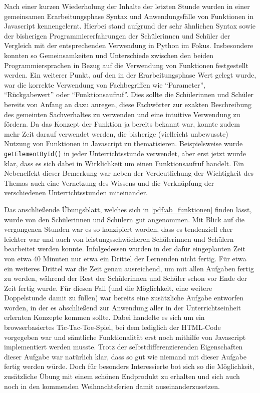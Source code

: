 Nach einer kurzen Wiederholung der Inhalte der letzten Stunde wurden in einer gemeinsamen Erarbeitungsphase Syntax und Anwendungsfälle von Funktionen in Javascript kennengelernt.
Hierbei stand aufgrund der sehr ähnlichen Syntax sowie der bisherigen Programmiererfahrungen der Schülerinnen und Schüler der Vergleich mit der entsprechenden Verwendung in Python im Fokus.
Insbesondere konnten so Gemeinsamkeiten und Unterschiede zwischen den beiden Programmiersprachen in Bezug auf die Verwendung von Funktionen festgestellt werden.
Ein weiterer Punkt, auf den in der Erarbeitungsphase Wert gelegt wurde, war die korrekte Verwendung von Fachbegriffen wie ``Parameter'', ``Rückgabewert'' oder ``Funktionsaufruf''.
Dies sollte die Schülerinnen und Schüler bereits von Anfang an dazu anregen, diese Fachwörter zur exakten Beschreibung des gemeinten Sachverhaltes zu verwenden und eine intuitive Verwendung zu fördern.
Da das Konzept der Funktion ja bereits bekannt war, konnte zudem mehr Zeit darauf verwendet werden, die bisherige (vielleicht unbewusste) Nutzung von Funktionen in Javascript zu thematisieren.
Beispielsweise wurde \texttt{getElementById()} in jeder Unterrichtsstunde verwendet, aber erst jetzt wurde klar, dass es sich dabei in Wirklichkeit um einen Funktionsaufruf handelt.
Ein Nebeneffekt dieser Bemerkung war neben der Verdeutlichung der Wichtigkeit des Themas auch eine Vernetzung des Wissens und die Verknüpfung der verschiedenen Unterrichtsstunden miteinander.

Das anschließende Übungsblatt, welches sich in \autoref{pdf:ab_funktionen} finden lässt, wurde von den Schülerinnen und Schülern gut angenommen.
Mit Blick auf die vergangenen Stunden war es so konzipiert worden, dass es tendenziell eher leichter war und auch von leistungsschwächeren Schülerinnen und Schülern bearbeitet werden konnte.
Infolgedessen wurden in der dafür eingeplanten Zeit von etwa 40 Minuten nur etwa ein Drittel der Lernenden nicht fertig.
Für etwa ein weiteres Drittel war die Zeit genau ausreichend, um mit allen Aufgaben fertig zu werden, während der Rest der Schülerinnen und Schüler schon vor Ende der Zeit fertig wurde.
Für diesen Fall (und die Möglichkeit, eine weitere Doppelstunde damit zu füllen) war bereits eine zusätzliche Aufgabe entworfen worden, in der es abschließend zur Anwendung aller in der Unterrichtseinheit erlernten Konzepte kommen sollte.
Dabei handelte es sich um ein browserbasiertes Tic-Tac-Toe-Spiel, bei dem lediglich der HTML-Code vorgegeben war und sämtliche Funktionalität erst noch mithilfe von Javascript implementiert werden musste.
Trotz der selbstdifferenzierenden Eigenschaften dieser Aufgabe war natürlich klar, dass so gut wie niemand mit dieser Aufgabe fertig werden würde.
Doch für besonders Interessierte bot sich so die Möglichkeit, zusätzliche Übung mit einem schönen Endprodukt zu erhalten und sich auch noch in den kommenden Weihnachtsferien damit auseinanderzusetzen.

